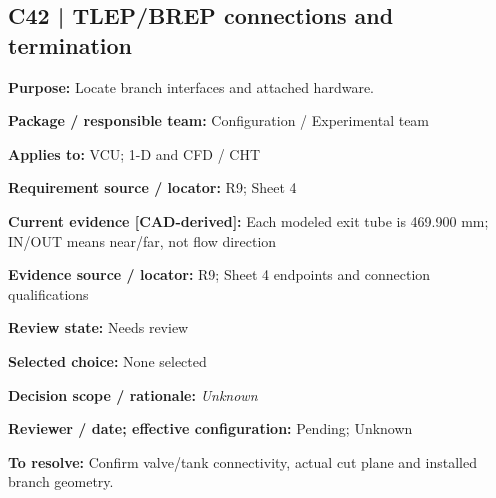 \documentclass[11pt]{article}
\begin{document}
\par\noindent\begin{minipage}{\textwidth}\small\setlength{\parskip}{2pt}
\subsection*{C42 | TLEP/BREP connections and termination}
\textbf{Purpose:} Locate branch interfaces and attached hardware.\par
\textbf{Package / responsible team:} Configuration / Experimental team\par
\textbf{Applies to:} VCU; 1-D and CFD / CHT\par
\textbf{Requirement source / locator:} R9; Sheet 4\par
\textbf{Current evidence [CAD-derived]:} Each modeled exit tube is 469.900 mm; IN/OUT means near/far, not flow direction\par
\textbf{Evidence source / locator:} R9; Sheet 4 endpoints and connection qualifications\par
\textbf{Review state:} Needs review\par
\textbf{Selected choice:} None selected\par
\textbf{Decision scope / rationale:} \textit{Unknown}\par
\textbf{Reviewer / date; effective configuration:} Pending; Unknown\par
\textbf{To resolve:} Confirm valve/tank connectivity, actual cut plane and installed branch geometry.\par
\end{minipage}\par\vspace{5pt}
\end{document}
